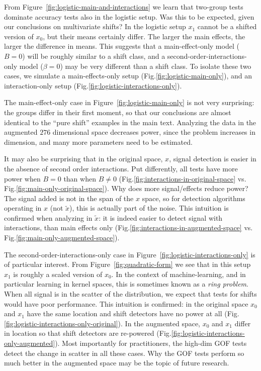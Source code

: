 \documentclass[oupdraft]{bio}
\begin{document}
From Figure~\ref{fig:logistic-main-and-interactions} we learn that two-group tests dominate accuracy tests also in the logistic setup.
Was this to be expected, given our conclusions on multivariate shifts?
In the logistic setup $x_1$ cannot be a shifted version of $x_0$, but their means certainly differ. 
The larger the main effects, the larger the difference in means.
This suggests that a main-effect-only model ($B=0$) will be roughly similar to a shift class, and a second-order-interactions-only model ($\beta=0$) may be very different than a shift class.
To isolate these two cases, we simulate a main-effects-only setup (Fig.\ref{fig:logistic-main-only}), and an interaction-only setup (Fig.\ref{fig:logistic-interactions-only}).


The main-effect-only case in Figure~\ref{fig:logistic-main-only} is not very surprising: 
the groups differ in their first moment, so that our conclusions are almost identical to the ``pure shift'' examples in the main text.
Analyzing the data in the augmented $276$ dimensional space decreases power, since the problem increases in dimension, and many more parameters need to be estimated. 

It may also be surprising that in the original space, $x$, signal detection is easier in the absence of second order interactions. 
Put differently, all tests have more power when $B=0$ than when $B \neq 0$ (Fig.\ref{fig:interactions-in-original-space} vs. Fig.\ref{fig:main-only-original-space}). 
Why does more signal/effects reduce power? 
The signal added is not in the span of the $x$ space, so for detection algorithms operating in $x$ (not $\tilde{x}$), this is actually part of the noise. 
This intuition is confirmed when analyzing in $\tilde x$: it is indeed easier to detect signal with interactions, than main effects only (Fig.\ref{fig:interactions-in-augmented-space} vs. Fig.\ref{fig:main-only-augmented-space}).

The second-order-interactions-only case in Figure~\ref{fig:logistic-interactions-only} is of particular interest. 
From Figure~\ref{fig:quadratic-form} we see that in this setup $x_1$ is roughly a scaled version of $x_0$.
In the context of machine-learning, and in particular learning in kernel spaces, this is sometimes known as a \emph{ring problem}.
When all signal is in the scatter of the distribution, we expect that tests for shifts would have poor performance. 
This intuition is confirmed: in the original space $x_0$ and $x_1$ have the same location and shift detectors have no power at all (Fig.\ref{fig:logistic-interactions-only-original}). 
In the augmented space, $x_0$ and $x_1$ differ in location so that shift detectors are re-powered (Fig.\ref{fig:logistic-interactions-only-augmented}). 
Most importantly for practitioners, the high-dim GOF tests detect the change in scatter in all these cases. 
Why the GOF tests perform so much better in the augmented space may be the topic of future research.
\end{document}

